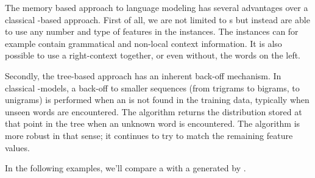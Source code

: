 \documentclass[a4paper,10pt,twoside]{report}
\begin{document}
The memory based approach to language modeling has several advantages
over a classical \ngram{}-based approach. First of all, we are not
limited to \ngram{}s but instead are able to use any number and type
of features in the instances. The instances can for example contain
grammatical and non-local context information. It is also possible to
use a right-context together, or even without, the words on the
left. 

Secondly, the tree-based approach has an inherent back-off
mechanism. In classical \ngram{}-models, a back-off to smaller
sequences (from trigrams to bigrams, to unigrams) is performed
when an \ngram{} is not found in the training data, typically when
unseen words are encountered. The \igtree{} algorithm returns the
distribution stored at that point in the tree when an unknown word is
encountered. The \triblt{} algorithm is more robust in that sense; it
continues to try to match the remaining feature values. 

In the following examples, we'll compare a \mb{} \lm{} with a \lm{}
generated by \srilm{}. 

\end{document}
